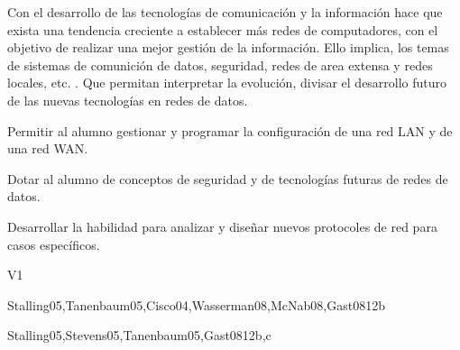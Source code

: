 \begin{syllabus}


\begin{justification}
   Con el desarrollo de las tecnologías de comunicación   y la información
    hace que exista una tendencia creciente a  establecer  más redes de
    computadores,  con el objetivo de realizar una mejor gestión de la
    información.  Ello implica, los temas de sistemas de comunición de  datos,
     seguridad, redes de area extensa  y redes  locales, etc.  . Que permitan
     interpretar la  evolución, divisar  el desarrollo  futuro de las
     nuevas  tecnologías en redes de datos.
   \end{justification}
   
   \begin{goals}
   \item Permitir al alumno gestionar y programar la configuración de una red LAN y de una red WAN.
   \item Dotar al alumno de conceptos de seguridad y de tecnologías futuras de redes de datos.
   \item Desarrollar la habilidad para analizar y diseñar nuevos protocoles de red para casos específicos.
   \end{goals}
   
   \begin{outcomes}{V1}
      \item {}
      \item {}
      \item {}
      \item {}
      \item {}
      \item {}
   \end{outcomes}
   
   \begin{unit}{\NCIntroduction}{}{Stalling05,Tanenbaum05,Cisco04,Wasserman08,McNab08,Gast08}{12}{b}
      \NCIntroductionAllTopics
      \NCIntroductionAllLearningOutcomes
   \end{unit}
   
   \begin{unit}{\NCNetworkedApplications}{}{Stalling05,Stevens05,Tanenbaum05,Gast08}{12}{b,c}
      \NCNetworkedApplicationsAllTopics
      \NCNetworkedApplicationsAllLearningOutcomes
   \end{unit}
   

\end{syllabus}
